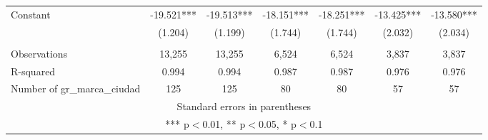 \begin{tabular}{lcccccc}
Constant & -19.521*** & -19.513*** & -18.151*** & -18.251*** & -13.425*** & -13.580*** \\
 & (1.204) & (1.199) & (1.744) & (1.744) & (2.032) & (2.034) \\
 &  &  &  &  &  &  \\
Observations & 13,255 & 13,255 & 6,524 & 6,524 & 3,837 & 3,837 \\
R-squared & 0.994 & 0.994 & 0.987 & 0.987 & 0.976 & 0.976 \\
 Number of gr\_marca\_ciudad & 125 & 125 & 80 & 80 & 57 & 57 \\ \hline
\multicolumn{7}{c}{ Standard errors in parentheses} \\
\multicolumn{7}{c}{ *** p$<$0.01, ** p$<$0.05, * p$<$0.1} \\
\end{tabular}
